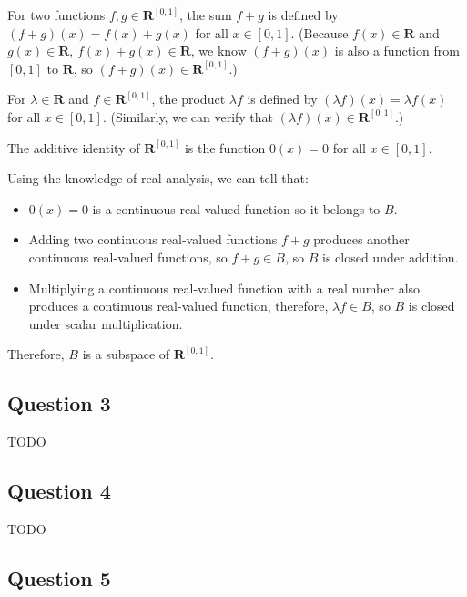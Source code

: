 \documentclass[12pt, letterpaper, oneside]{book}
\begin{document}
For two functions $f, g \in \mathbf{R}^{[0,1]}$, the sum $f + g$ is defined by
$(f + g)(x) = f(x) + g(x)$ for all $x \in [0,1]$. (Because $f(x) \in
\mathbf{R}$ and $g(x) \in \mathbf{R}$, $f(x) + g(x) \in \mathbf{R}$, we know
$(f + g)(x)$ is also a function from $[0,1]$ to $\mathbf{R}$, so $(f + g)(x)
\in \mathbf{R}^{[0,1]}$.)

For $\lambda \in \mathbf{R}$ and $f \in \mathbf{R}^{[0,1]}$, the product
$\lambda f$ is defined by $(\lambda f)(x) = \lambda f(x)$ for all $x \in [0,1]$.
(Similarly, we can verify that $(\lambda f)(x) \in \mathbf{R}^{[0,1]}$.)

The additive identity of $\mathbf{R}^{[0,1]}$ is the function $0(x) = 0$ for
all $x \in [0,1]$.

Using the knowledge of real analysis, we can tell that:
\begin{itemize}
  \item $0(x) = 0$ is a continuous real-valued function so it belongs to $B$.
  \item Adding two continuous real-valued functions $f + g$ produces another
    continuous real-valued functions, so $f + g \in B$, so $B$ is closed under
    addition.
  \item Multiplying a continuous real-valued function with a real number also
    produces a continuous real-valued function, therefore, $\lambda f \in B$,
    so $B$ is closed under scalar multiplication.
\end{itemize}

Therefore, $B$ is a subspace of $\mathbf{R}^{[0,1]}$.

\subsection{Question 3}

TODO

\subsection{Question 4}

TODO

\subsection{Question 5}
\end{document}
